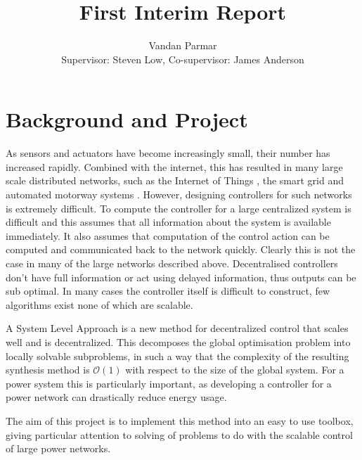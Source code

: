 \documentclass[11pt,a4paper]{article}
\begin{document}
\title{First Interim Report}
\author{Vandan Parmar \\
Supervisor: Steven Low, Co-supervisor: James Anderson}
\maketitle
\section*{Background and Project}
As sensors and actuators have become increasingly small, their number has increased rapidly. Combined with the internet, this has resulted in many large scale distributed networks, such as the Internet of Things \cite{Atzori2010}, the smart grid \cite{Amin2005,Farhangi2010} and automated motorway systems \cite{Chien1997}. However, designing controllers for such networks is extremely difficult. To compute the controller for a large centralized system is difficult and this assumes that all information about the system is available immediately. It also assumes that computation of the control action can be computed and communicated back to the network quickly. Clearly this is not the case in many of the large networks described above. Decentralised controllers don't have full information or act using delayed information, thus outputs can be sub optimal. In many cases the controller itself is difficult to construct, few algorithms exist none of which are scalable.

A System Level Approach \cite{Wang2017} is a new method for decentralized control that scales well and is decentralized. This decomposes the global optimisation problem into locally solvable subproblems, in such a way that the complexity of the resulting synthesis method is $\mathcal{O}(1)$ with respect to the size of the global system. For a power system this is particularly important, as developing a controller for a power network can drastically reduce energy usage. 

The aim of this project is to implement this method into an easy to use toolbox, giving particular attention to solving of problems to do with the scalable control of large power networks.
\end{document}
